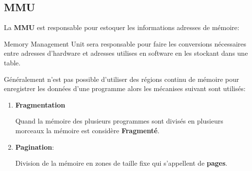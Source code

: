 \documentclass{article}
\begin{document}
\subsection{MMU}
La \textbf{MMU} est responsable pour estoquer les informations adresses de mémoire:
\begin{definition}
    Memory Management Unit sera responsable pour faire les conversions nécessaires entre adresses d'hardware et adresses utilises en software en les stockant dans une table.
\end{definition}
Généralement n'est pas possible d'utiliser des régions continu de mémoire pour enregistrer les données d'une programme alors les mécanises suivant sont utilisés:
\begin{enumerate}[rightmargin=\leftmargin]
    \item \textbf{Fragmentation}
    \begin{definition}
        Quand la mémoire des plusieurs programmes sont divisés en plusieurs morceaux la mémoire est considère \textbf{Fragmenté}.
    \end{definition}

    \item \textbf{Pagination}:
    \begin{definition}
        Division de la mémoire en zones de taille fixe qui s'appellent de \textbf{pages}.
        \begin{figure}[H]
            \centering{}
\end{figure}
\end{definition}
\end{enumerate}
\end{document}
